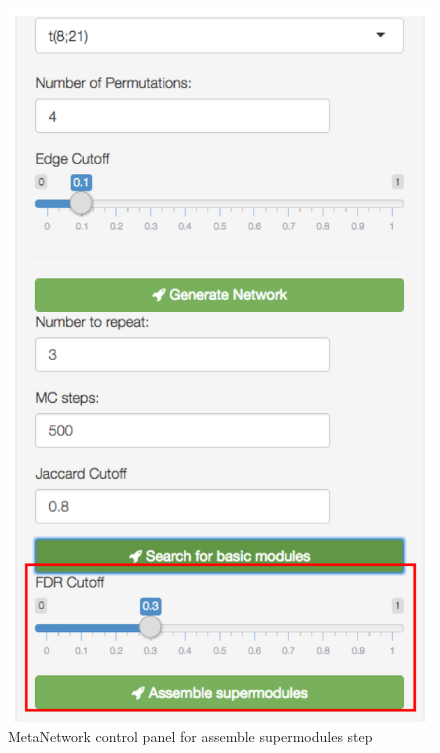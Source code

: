 \begin{steps}
\begin{figure}[H]
\begin{center}
\includegraphics[scale=0.5]{./figure/MetaNetwork/MetaNetworkstep3}
\caption{MetaNetwork control panel for assemble supermodules step}
\label{fig:MetaNetworkstep3}
\end{center}
\end{figure}



\end{steps}

